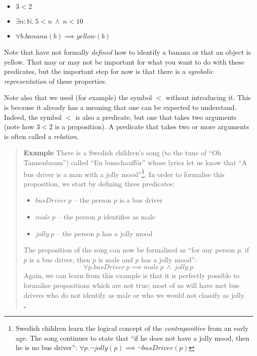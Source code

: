 \documentclass{tufte-handout}
\newcounter{example}
\newenvironment{example}
{\refstepcounter{example}\begin{quote}
\textbf{Example \arabic{example}}}
{

$\square$\end{quote}}
\begin{document}
\begin{itemize}
\item $3 < 2$
\item $\exists n : \mathbb{N} .~ 5 < n ~\land~ n < 10$
\item $\forall b. \mathit{banana}(b) \implies \mathit{yellow}(b)$
\end{itemize}

\noindent
Note that have not formally \emph{defined} how to identify a
banana or that an object is yellow. That may or may not be
important for what you want to do with these predicates, but the
important step for now is that there is a \emph{symbolic
  representation} of these properties.

Note also that we used (for example) the symbol $<$ without
introducing it. This is because it already has a meaning that one
can be expected to understand. Indeed, the symbol $<$ is also a
predicate, but one that takes two arguments (note how $3 < 2$ is a
proposition). A predicate that takes two or more arguments is
often called a \emph{relation}.

\begin{example}\label{busdriver}
  There is a Swedish children's song (to the tune of ``Oh
  Tannenbaum'') called ``En busschauff\"{o}r'' whose lyrics let us
  know that ``A bus driver is a man with a jolly
  mood''\footnote{Swedish children learn the logical concept of
    the \emph{contrapositive} from an early age. The song
    continues to state that ``if he does not have a jolly mood,
    then he is no bus driver'':
    $\forall p. \lnot \mathit{jolly}(p) \implies \lnot
    \mathit{busDriver}(p)$}. In order to formalise this
  proposition, we start by defining three predicates:
  \begin{itemize}
  \item $\mathit{busDriver}~p$ -- the person $p$ is a bus driver
  \item $\mathit{male}~p$ -- the person $p$ identifies as male
  \item $\mathit{jolly}~p$ -- the person $p$ has a jolly mood
  \end{itemize}
  The proposition of the song can now be formalised as ``for any
  person $p$, if $p$ is a bus driver, then $p$ is male and $p$ has
  a jolly mood'':
  \[
    \forall p.
    \mathit{busDriver}~p \implies
    \mathit{male}~p ~\land~
    \mathit{jolly}~p
  \]
  Again, we can learn from this example is that it is perfectly
  possible to formalise propositions which are not true; most of
  us will have met bus drivers who do not identify as male or who
  we would not classify as jolly.
\end{example}
\end{document}
